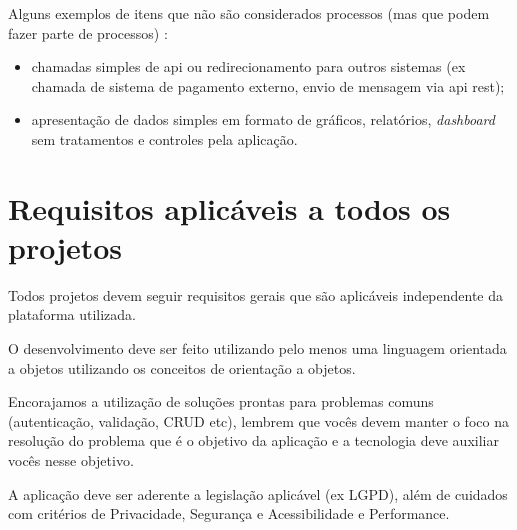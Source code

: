 Alguns exemplos de itens que não são considerados processos (mas que podem fazer parte de processos) :

\begin{itemize}

    \item chamadas simples de \ac{api} ou redirecionamento para outros sistemas (ex chamada de sistema de pagamento externo, envio de mensagem via \ac{api} \gls{rest});

    \item apresentação de dados simples em formato de gráficos, relatórios, \emph{dashboard} sem tratamentos e controles pela aplicação.
\end{itemize}


\section{Requisitos aplicáveis a todos os projetos}

Todos projetos devem seguir requisitos gerais que são aplicáveis independente da plataforma utilizada. 

O desenvolvimento deve ser feito utilizando pelo menos uma linguagem orientada a objetos utilizando os conceitos de orientação a objetos.

Encorajamos a utilização de soluções prontas para problemas comuns (autenticação, validação, CRUD etc), lembrem que vocês devem manter o foco na resolução do problema que é o objetivo da aplicação e a tecnologia deve auxiliar vocês nesse objetivo.







A aplicação deve ser aderente a legislação aplicável (ex LGPD), além de cuidados com critérios de Privacidade, Segurança e Acessibilidade e Performance.


